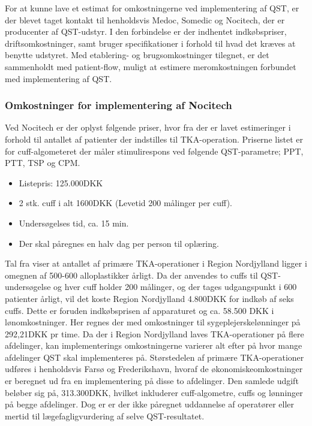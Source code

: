 For at kunne lave et estimat for omkostningerne ved implementering af QST, er der blevet taget kontakt til 
henholdsvis Medoc, Somedic og Nocitech, der er producenter af QST-udstyr. I den forbindelse er der indhentet indkøbspriser, driftsomkostninger, samt bruger specifikationer i forhold til hvad det kræves at benytte udstyret. Med etablering- og brugsomkostninger tilegnet, er det sammenholdt med patient-flow, muligt at estimere meromkostningen forbundet med implementering af QST. 

\subsubsection{Omkostninger for implementering af Nocitech}\label{priser}
Ved Nocitech er der oplyst følgende priser, hvor fra der er lavet estimeringer i forhold til antallet af patienter der indstilles til TKA-operation. Priserne listet er for cuff-algometeret der måler stimulirespons ved følgende QST-parametre; PPT, PTT, TSP og CPM.

\begin{itemize}  
\item Listepris: 125.000DKK
\item 2 stk. cuff i  alt 1600DKK (Levetid 200 målinger per cuff).
\item Undersøgelses tid, ca. 15 min.
\item Der skal påregnes en halv dag per person til oplæring.
\end{itemize}

Tal fra  viser at antallet af primære TKA-operationer i Region Nordjylland ligger i omegnen af 500-600 alloplastikker årligt. Da der anvendes to cuffs til QST-undersøgelse og hver cuff holder 200 målinger, og der tages udgangspunkt i 600 patienter årligt, vil det koste Region Nordjylland 4.800DKK for indkøb af seks cuffs. Dette er foruden indkøbsprisen af apparaturet og ca. 58.500 DKK i lønomkostninger. Her regnes der med omkostninger til sygeplejerskelønninger på 292,21DKK pr time. \citep{DST1} \citep{DST2} Da der i Region Nordjylland laves TKA-operationer på flere afdelinger, kan implementerings omkostningerne varierer alt efter på hvor mange afdelinger QST skal implementeres på. Størstedelen af primære TKA-operationer udføres i henholdsvis Farsø og Frederikshavn, hvoraf de økonomiskeomkostninger er beregnet ud fra en implementering på disse to afdelinger. Den samlede udgift beløber sig på, 313.300DKK, hvilket inkluderer cuff-algometre, cuffs og lønninger på begge afdelinger. Dog er er der ikke påregnet uddannelse af operatører eller mertid til lægefagligvurdering af selve QST-resultatet.


